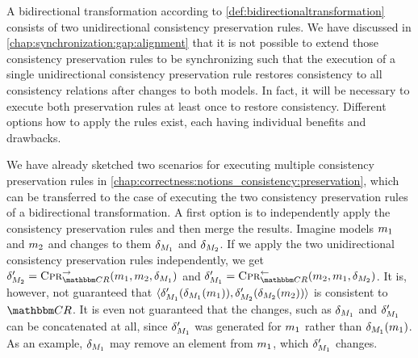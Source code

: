 A bidirectional transformation according to \autoref{def:bidirectionaltransformation} consists of two unidirectional consistency preservation rules.
We have discussed in \autoref{chap:synchronization:gap:alignment} that it is not possible to extend those consistency preservation rules to be synchronizing such that the execution of a single unidirectional consistency preservation rule restores consistency to all consistency relations after changes to both models.
In fact, it will be necessary to execute both preservation rules at least once to restore consistency.
Different options how to apply the rules exist, each having individual benefits and drawbacks.

We have already sketched two scenarios for executing multiple consistency preservation rules in \autoref{chap:correctness:notions_consistency:preservation}, which can be transferred to the case of executing the two consistency preservation rules of a bidirectional transformation.
A first option is to independently apply the consistency preservation rules and then merge the results.
Imagine models $\model{m}{1}$ and $\model{m}{2}$ and changes to them $\change{\metamodel{M}{1}}$ and $\change{\metamodel{M}{2}}$.
If we apply the two unidirectional consistency preservation rules independently, we get $\change{\metamodel{M}{2}}' = \consistencypreservationrule{\consistencyrelationset{CR}}^{\rightarrow}(\model{m}{1},\model{m}{2}, \change{\metamodel{M}{1}})$ and $\change{\metamodel{M}{1}}' = \consistencypreservationrule{\consistencyrelationset{CR}{}}^{\leftarrow}(\model{m}{2}, \model{m}{1}, \change{\metamodel{M}{2}})$.
It is, however, not guaranteed that $\tupled{\change{\metamodel{M}{1}}'(\change{\metamodel{M}{1}}(\model{m}{1})), \change{\metamodel{M}{2}}'(\change{\metamodel{M}{2}}(\model{m}{2}))}$ is consistent to $\consistencyrelationset{CR}$.
It is even not guaranteed that the changes, such as $\change{\metamodel{M}{1}}$ and $\change{\metamodel{M}{1}}'$ can be concatenated at all, since $\change{\metamodel{M}{1}}'$ was generated for $\model{m}{1}$ rather than $\change{\metamodel{M}{1}}(\model{m}{1})$.
As an example, $\change{\metamodel{M}{1}}$ may remove an element from $\model{m}{1}$, which $\change{\metamodel{M}{1}}'$ changes.
